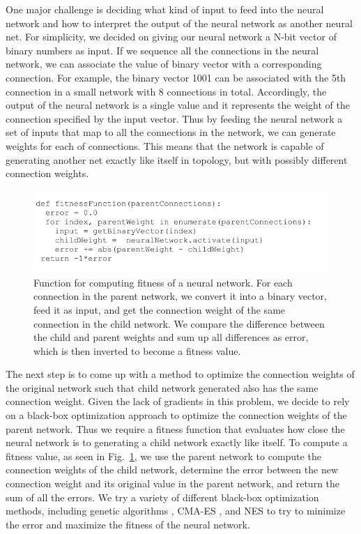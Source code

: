 \documentclass[12pt]{article}
\begin{document}
One major challenge is deciding what kind of input
to feed into the neural network and how to interpret the output
of the neural network as another neural net.
For simplicity,
we decided on giving our neural network a N-bit vector
of binary numbers as input.
If we sequence all the connections in the neural network,
we can associate the value of binary vector
with a corresponding connection.
For example, the binary vector 1001
can be associated with the 5th connection
in a small network with 8 connections in total.
Accordingly, the output of the neural network
is a single value
and it represents the weight
of the connection specified by the input vector.
Thus by feeding the neural network
a set of inputs that map to all the connections in the network,
we can generate weights for each of connections.
This means that the network is capable of generating another net
exactly like itself in topology,
but with possibly different connection weights. 

\begin{figure}[h]
\begin{center}
  \includegraphics[width=0.8\linewidth]{pseudo.png}
\end{center}
   \caption{Function for computing fitness of a neural network.
For each connection in the parent network,
we convert it into a binary vector,
feed it as input,
and get the connection weight
of the same connection in the child network.
We compare the difference
between the child and parent weights
and sum up all differences as error,
which is then inverted to become a fitness value.}
\label{pseudo}
\end{figure} 

The next step is to come up with
a method to optimize the connection weights
of the original network such that child network generated
also has the same connection weight.
Given the lack of gradients in this problem,
we decide to rely on a black-box optimization approach
to optimize the connection weights of the parent network.
Thus we require a fitness function
that evaluates how close the neural network is
to generating a child network exactly like itself.
To compute a fitness value,
as seen in Fig.~\ref{pseudo},
we use the parent network
to compute the connection weights of the child network,
determine the error between the new connection weight
and its original value in the parent network,
and return the sum of all the errors.
We try a variety of different black-box optimization methods,
including genetic algorithms \cite{deb2002fast},
CMA-ES \cite{hansen2003reducing},
and NES \cite{wierstra2008natural}
to try to minimize the error
and maximize the fitness of the neural network.
\end{document}
